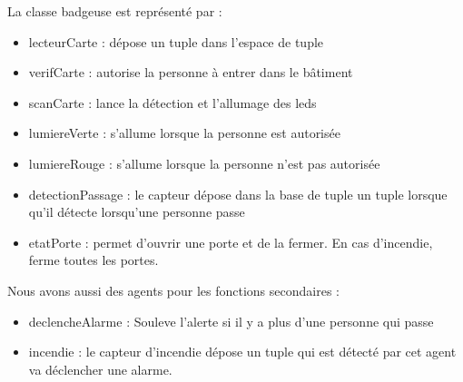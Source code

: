 \documentclass[a4paper,10pt]{article}
\begin{document}
    \vspace{5mm} 

    La classe badgeuse est représenté par :

    \begin{itemize}
        \item lecteurCarte : dépose un tuple dans l'espace de tuple
        \item verifCarte : autorise la personne à entrer dans le bâtiment
        \item scanCarte : lance la détection et l'allumage des leds
        \item lumiereVerte : s'allume lorsque la personne est autorisée
        \item lumiereRouge : s'allume lorsque la personne n'est pas autorisée
        \item detectionPassage : le capteur dépose dans la base de tuple un tuple lorsque qu'il détecte lorsqu'une personne passe
        \item etatPorte : permet d'ouvrir une porte et de la fermer. En cas d'incendie, ferme toutes les portes.
    \end{itemize}

    Nous avons aussi des agents pour les fonctions secondaires : 
    \begin{itemize}
        \item declencheAlarme : Souleve l'alerte si il y a plus d'une personne qui passe
        \item incendie : le capteur d'incendie dépose un tuple qui est détecté par cet agent va déclencher une alarme.
    
    \end{itemize}
        
    \pagebreak
\end{document}
